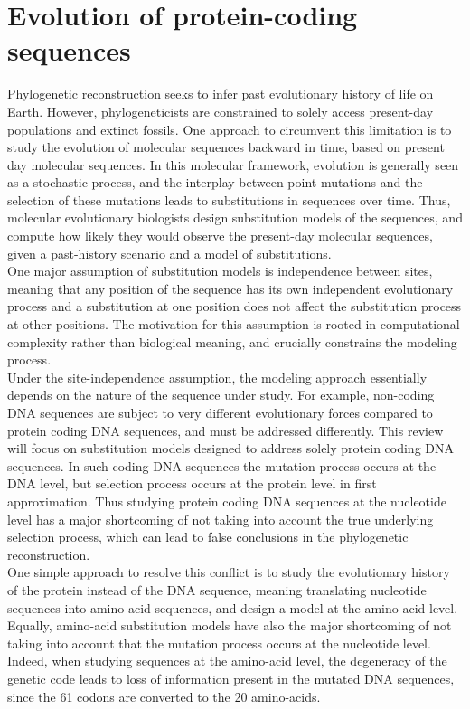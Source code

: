\documentclass{article}
\begin{document}
\newpage

\section{Evolution of protein-coding sequences}

Phylogenetic reconstruction seeks to infer past evolutionary history of life on Earth.
However, phylogeneticists are constrained to solely access present-day populations and extinct fossils.
One approach to circumvent this limitation is to study the evolution of molecular sequences backward in time, based on present day molecular sequences.
In this molecular framework, evolution is generally seen as a stochastic process, and the interplay between point mutations and the selection of these mutations leads to substitutions in sequences over time.
Thus, molecular evolutionary biologists design substitution models of the sequences, and compute how likely they would observe the present-day molecular sequences, given a past-history scenario and a model of substitutions.\\

One major assumption of substitution models is independence between sites, meaning that any position of the sequence has its own independent evolutionary process and a substitution at one position does not affect the substitution process at other positions.
The motivation for this assumption is rooted in computational complexity rather than biological meaning, and crucially constrains the modeling process.\\

Under the site-independence assumption, the modeling approach essentially depends on the nature of the sequence under study.
For example, non-coding DNA sequences are subject to very different evolutionary forces compared to protein coding DNA sequences, and must be addressed differently.
This review will focus on substitution models designed to address solely protein coding DNA sequences.
In such coding DNA sequences the mutation process occurs at the DNA level, but selection process occurs at the protein level in first approximation.
Thus studying protein coding DNA sequences at the nucleotide level has a major shortcoming of not taking into account the true underlying selection process, which can lead to false conclusions in the phylogenetic reconstruction.\\

One simple approach to resolve this conflict is to study the evolutionary history of the protein instead of the DNA sequence, meaning translating nucleotide sequences into amino-acid sequences, and design a model at the amino-acid level.
Equally, amino-acid substitution models have also the major shortcoming of not taking into account that the mutation process occurs at the nucleotide level.
Indeed, when studying sequences at the amino-acid level, the degeneracy of the genetic code leads to loss of information present in the mutated DNA sequences, since the 61 codons are converted to the 20 amino-acids.\\
 
\end{document}

